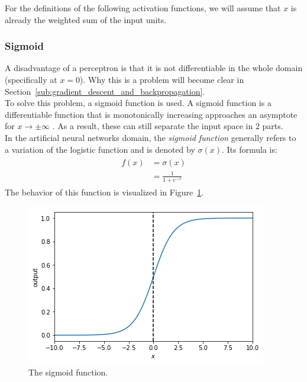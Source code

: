 For the definitions of the following activation functions, we will assume that $x$ is already the weighted sum of the input units.

\subsubsection{Sigmoid} %
\label{ssub:sigmoid}
A disadvantage of a perceptron is that it is not differentiable in the whole domain (specifically at $x=0$). Why this is a problem will become clear in Section~\ref{sub:gradient_descent_and_backpropagation}.\\
To solve this problem, a sigmoid function is used. A sigmoid function is a differentiable function that is monotonically increasing approaches an asymptote for $x \to \pm\infty$ \citep{series/lncs/LeCunBOM12}. As a result, these can still separate the input space in 2 parts.\\
In the artificial neural networks domain, the \textit{sigmoid function} generally refers to a variation of the logistic function and is denoted by $\sigma(x)$. Its formula is:
\begin{align}
    \begin{split}
        f(x) &= \sigma(x)\\
        &= \frac{1}{1+e^{-x}}
    \end{split}
\end{align}
The behavior of this function is visualized in Figure~\ref{fig:sigmoid}.
\begin{figure}[htb]
    \centering
    \includegraphics[width=.8\linewidth]{images/activation_functions/sigmoid.png}
    \caption[The sigmoid function]{The sigmoid function.}
    \label{fig:sigmoid}
\end{figure}

